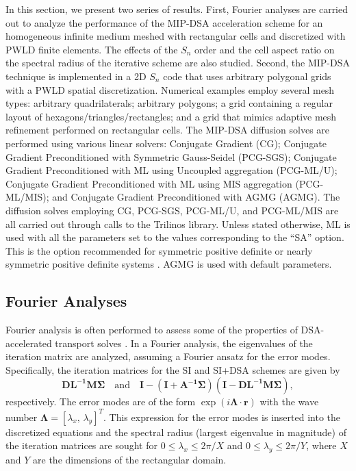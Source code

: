 \documentclass[preprint,10pt]{elsarticle}
\newcommand\bs{\boldsymbol}
\renewcommand{\(}{\left(}
\renewcommand{\)}{\right)}
\renewcommand{\[}{\left[}
\renewcommand{\]}{\right]}
\newcommand{\sn}{\ensuremath{S_n}\xspace}
\begin{document}
In this section, we present two series of results. First, Fourier analyses are 
carried out to analyze the performance of the MIP-DSA acceleration scheme 
for an homogeneous infinite medium meshed with rectangular cells and discretized with PWLD finite elements.
The effects of the $S_n$ order and the cell aspect ratio on the spectral radius of the iterative 
scheme are also studied. Second, the MIP-DSA technique is implemented in a 2D \sn code that uses
arbitrary polygonal grids with a PWLD spatial discretization.  Numerical examples employ
several mesh types: arbitrary quadrilaterals; arbitrary polygons; a grid containing a regular layout of 
hexagons/triangles/rectangles; and a grid that mimics adaptive mesh refinement 
performed on rectangular cells. The MIP-DSA diffusion solves are performed using various
linear solvers: Conjugate Gradient (CG); Conjugate Gradient
Preconditioned with Symmetric Gauss-Seidel (PCG-SGS); Conjugate Gradient
Preconditioned with ML using Uncoupled aggregation (PCG-ML/U);
Conjugate Gradient Preconditioned with ML using MIS aggregation (PCG-ML/MIS);
and Conjugate Gradient Preconditioned with AGMG (AGMG). 
The diffusion solves employing CG, PCG-SGS, PCG-ML/U, and PCG-ML/MIS are all carried
out through calls to the Trilinos library.
Unless stated otherwise, ML is
used with all the parameters set to the values corresponding to the ``SA''
option. This is the option recommended for symmetric positive definite or nearly
symmetric positive definite systems \cite{ml_guide}. AGMG is used with default parameters.


\subsection{Fourier Analyses}

Fourier analysis is often performed to assess some of the properties of 
DSA-accelerated transport solves \cite{dsa_ref,larsen_dsa,consistent_p1}. In a Fourier analysis,
the eigenvalues of the iteration matrix are analyzed, assuming a Fourier ansatz for the 
error modes. Specifically, the iteration matrices for the SI and SI+DSA schemes are given by
\begin{equation}
\bs{D L^{-1}M \Sigma} \quad \text{and} \quad \bs{I}-\bs{(I+A^{-1}\Sigma)(I-D L^{-1}M \Sigma)},
\end{equation}
respectively.  The error modes are of the form $\exp(i \bs{\Lambda} \cdot \bs{r})$ with the
wave number $\bs{\Lambda}=[\lambda_x,\, \lambda_y]^T$. This expression for the error modes 
is inserted into the discretized equations and the spectral radius (largest eigenvalue in magnitude)
of the iteration matrices are sought for $0 \le \lambda_x \le 2\pi/X$ and $0 \le \lambda_y \le 2\pi/Y$,
where $X$ and $Y$ are the dimensions of the rectangular domain.
\end{document}
